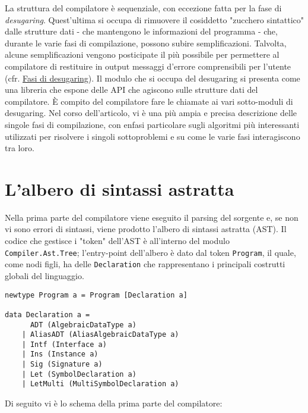 \documentclass[10pt,a4paper]{article}
\begin{document}
La struttura del compilatore è sequenziale, con eccezione fatta per la fase di \textit{desugaring}. Quest'ultima si
occupa di rimuovere il cosiddetto "zucchero sintattico" dalle strutture dati - che mantengono le informazioni del
programma - che, durante le varie fasi di compilazione, possono subire semplificazioni. Talvolta, alcune semplificazioni
vengono posticipate il più possibile per permettere al compilatore di restituire in output messaggi d'errore comprensibili
per l'utente (cfr. \hyperlink{Fasi di desugaring}{Fasi di desugaring}). Il modulo che si occupa del desugaring si presenta
come una libreria che espone delle API che agiscono
sulle strutture dati del compilatore. \`E compito del compilatore fare le chiamate ai vari sotto-moduli di desugaring.
Nel corso dell'articolo,
vi è una più ampia e precisa descrizione delle singole fasi di compilazione, con enfasi particolare sugli algoritmi
più interessanti utilizzati per risolvere i singoli sottoproblemi e su come le varie fasi interagiscono tra loro.

\section{L'albero di sintassi astratta}
Nella prima parte del compilatore viene eseguito il parsing del sorgente e, se non vi sono errori di sintassi, viene prodotto
l'albero di sintassi astratta (AST). Il codice che gestisce i "token" dell'AST è
all'interno del modulo \texttt{Compiler.Ast.Tree}; l'entry-point dell'albero è dato dal token \texttt{Program}, il
quale, come nodi figli, ha delle \texttt{Declaration} che rappresentano i principali costrutti globali del linguaggio.

\begin{lstlisting}
newtype Program a = Program [Declaration a]

data Declaration a =
      ADT (AlgebraicDataType a)
    | AliasADT (AliasAlgebraicDataType a)
    | Intf (Interface a)
    | Ins (Instance a)
    | Sig (Signature a)
    | Let (SymbolDeclaration a)
    | LetMulti (MultiSymbolDeclaration a)
\end{lstlisting}

Di seguito vi è lo schema della prima parte del compilatore: \newline
\end{document}
